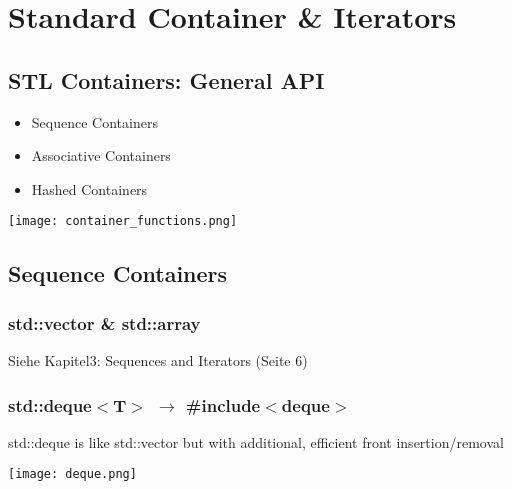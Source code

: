 
\section{Standard Container \& Iterators}

\subsection{STL Containers: General API}
\begin{itemize}
    \item Sequence Containers
    \item Associative Containers
    \item Hashed Containers
\end{itemize}
\begin{center}
    \texttt{[image: container\_functions.png]}
\end{center}

\subsection{Sequence Containers}
\subsubsection{std::vector \& std::array}
Siehe Kapitel3: Sequences and Iterators (Seite 6)
\subsubsection{std::deque$<$T$>$ $\rightarrow$ \#include$<$deque$>$}
std::deque is like std::vector but with additional, efficient front insertion/removal
\begin{center}
    \texttt{[image: deque.png]}
\end{center}
